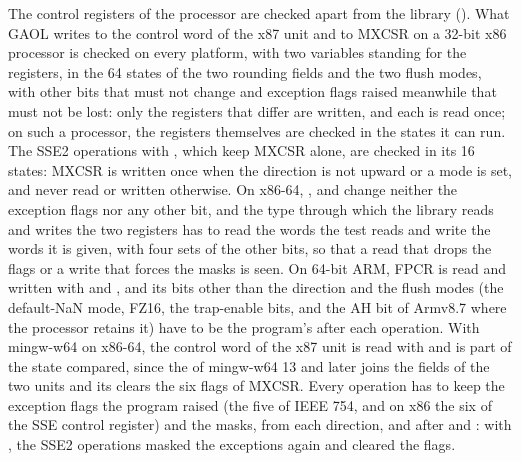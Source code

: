 \medskip
The control registers of the processor are checked apart from the library
(). What GAOL writes to the control word of the
x87 unit and to MXCSR on a 32-bit x86 processor is checked on every platform,
with two variables standing for the registers, in the 64 states of the two
rounding fields and the two flush modes, with other bits that must not change
and exception flags raised meanwhile that must not be lost: only the registers
that differ are written, and each is read once; on such a processor, the
registers themselves are checked in the states it can run. The
SSE2 operations with , which keep MXCSR
alone, are checked in its 16 states: MXCSR is written once when the
direction is not upward or a mode is set, and never read or written
otherwise. On x86-64, ,  and
 change neither the exception flags
nor any other bit, and the type through which the library reads and writes
the two registers has to read the words the test reads and write the words
it is given, with four sets of the other bits, so that a read that drops the
flags or a write that forces the masks is seen. On 64-bit ARM, FPCR is read
and written with  and , and its bits other than the
direction and the flush modes (the default-NaN mode, FZ16, the trap-enable
bits, and the AH bit of Armv8.7 where the processor retains it) have to be
the program's after each operation.\newinvfive{} With mingw-w64 on x86-64,
the control word of the x87 unit is read with  and is part of
the state compared, since the  of mingw-w64 13 and later
joins the fields of the two units and its  clears the six
flags of MXCSR. Every operation has to keep the exception flags the program
raised (the five of IEEE 754, and on x86 the six of the SSE control
register) and the masks, from each direction, and after
 and : with
, the SSE2 operations masked the exceptions
again and cleared the flags.\newinvfive

